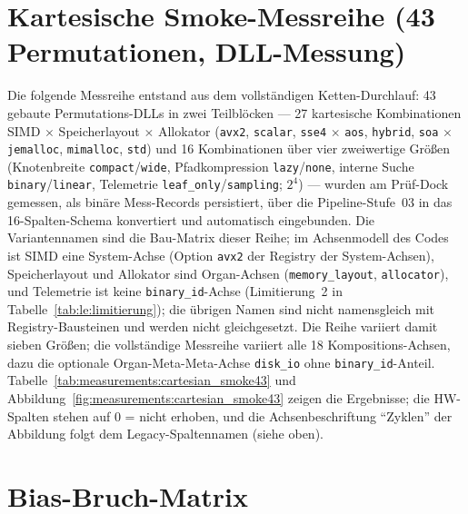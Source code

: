 


\section[head={Kartesische Smoke-Messreihe (43 Permutationen)}]{Kartesische Smoke-Messreihe (43 Permutationen, DLL-Messung)}

Die folgende Messreihe entstand aus dem vollständigen Ketten-Durchlauf: 43 gebaute Permutations-DLLs
in zwei Teilblöcken --- 27 kartesische Kombinationen SIMD $\times$ Speicherlayout $\times$ Allokator
(\texttt{avx2}, \texttt{scalar}, \texttt{sse4} $\times$ \texttt{aos}, \texttt{hybrid}, \texttt{soa}
$\times$ \texttt{jemalloc}, \texttt{mimalloc}, \texttt{std}) und 16 Kombinationen über vier
zweiwertige Größen (Knotenbreite \texttt{compact}/\texttt{wide}, Pfadkompression
\texttt{lazy}/\texttt{none}, interne Suche \texttt{binary}/\texttt{linear}, Telemetrie
\texttt{leaf\_only}/\texttt{sampling}; $2^4$) --- wurden am Prüf-Dock gemessen, als binäre
Mess-Records persistiert, über die Pipeline-Stufe~03 in das 16-Spalten-Schema konvertiert und
automatisch eingebunden. Die Variantennamen sind die Bau-Matrix dieser Reihe; im Achsenmodell des
Codes ist SIMD eine System-Achse (Option \texttt{avx2} der Registry der System-Achsen),
Speicherlayout und Allokator sind Organ-Achsen (\texttt{memory\_layout}, \texttt{allocator}), und
Telemetrie ist keine \texttt{binary\_id}-Achse (Limitierung~2 in
Tabelle~\ref{tab:le:limitierung}); die übrigen Namen sind nicht namensgleich mit
Registry-Bausteinen und werden nicht gleichgesetzt. Die Reihe variiert damit sieben Größen; die
vollständige Messreihe variiert alle 18 Kompositions-Achsen, dazu die optionale Organ-Meta-Meta-Achse
\texttt{disk\_io} ohne \texttt{binary\_id}-Anteil. Tabelle~\ref{tab:measurements:cartesian_smoke43}
und Abbildung~\ref{fig:measurements:cartesian_smoke43} zeigen die Ergebnisse; die HW-Spalten stehen
auf 0 = nicht erhoben, und die Achsenbeschriftung \enquote{Zyklen} der Abbildung folgt dem
Legacy-Spaltennamen (siehe oben).




\section{Bias-Bruch-Matrix}\label{sec:measurements:bias}

